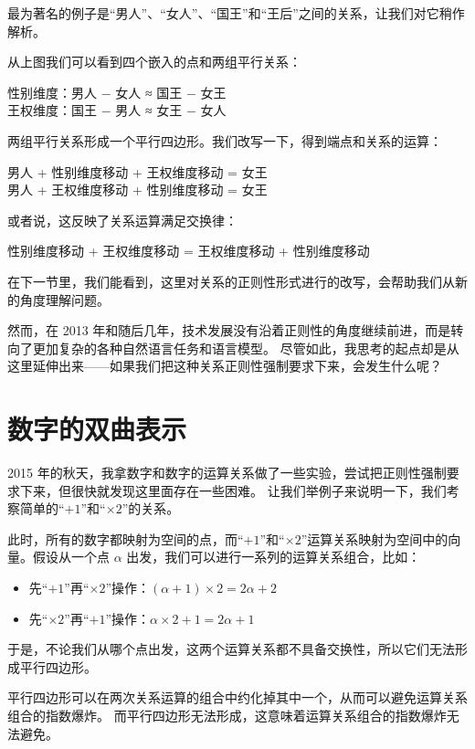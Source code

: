\documentclass[a4paper,12pt]{book}
\numberwithin{problem}{section}
\numberwithin{definition}{section}
\numberwithin{lemma}{section}
\numberwithin{proposition}{section}
\numberwithin{theorem}{section}
\numberwithin{grammar}{section}
\numberwithin{program}{section}
\numberwithin{convention}{section}
\numberwithin{corollary}{section}
\begin{document}
最为著名的例子是“男人”、“女人”、“国王”和“王后”之间的关系，让我们对它稍作解析。

从上图我们可以看到四个嵌入的点和两组平行关系：

\colorbox{red!10}{
性别维度：男人 $-$ 女人 ≈ 国王  $-$ 女王
}
\\
\colorbox{blue!10}{
王权维度：国王 $-$ 男人 ≈ 女王  $-$ 女人
}

两组平行关系形成一个平行四边形。我们改写一下，得到端点和关系的运算：

\colorbox{yellow!10}{男人 + 性别维度移动 + 王权维度移动 = 女王}
\\
\colorbox{yellow!10}{男人 + 王权维度移动 + 性别维度移动 = 女王}

或者说，这反映了关系运算满足交换律：

\colorbox{yellow!10}{性别维度移动 + 王权维度移动 = 王权维度移动 + 性别维度移动}

在下一节里，我们能看到，这里对关系的正则性形式进行的改写，会帮助我们从新的角度理解问题。

然而，在 2013 年和随后几年，技术发展没有沿着正则性的角度继续前进，而是转向了更加复杂的各种自然语言任务和语言模型。
尽管如此，我思考的起点却是从这里延伸出来——如果我们把这种关系正则性强制要求下来，会发生什么呢？

\section{数字的双曲表示}

2015 年的秋天，我拿数字和数字的运算关系做了一些实验，尝试把正则性强制要求下来，但很快就发现这里面存在一些困难。
让我们举例子来说明一下，我们考察简单的“$+1$”和“$\times 2$”的关系。

此时，所有的数字都映射为空间的点，而“$+1$”和“$\times 2$”运算关系映射为空间中的向量。假设从一个点 $\alpha$ 出发，我们可以进行一系列的运算关系组合，比如：
\begin{itemize}
\item 先“$+1$”再“$\times 2$”操作：$(\alpha +1) \times 2 = 2 \alpha + 2$
\item 先“$\times 2$”再“$+1$”操作：$\alpha \times 2 + 1 = 2 \alpha + 1$
\end{itemize}

于是，不论我们从哪个点出发，这两个运算关系都不具备交换性，所以它们无法形成平行四边形。

平行四边形可以在两次关系运算的组合中约化掉其中一个，从而可以避免运算关系组合的指数爆炸。
而平行四边形无法形成，这意味着运算关系组合的指数爆炸无法避免。
\end{document}
